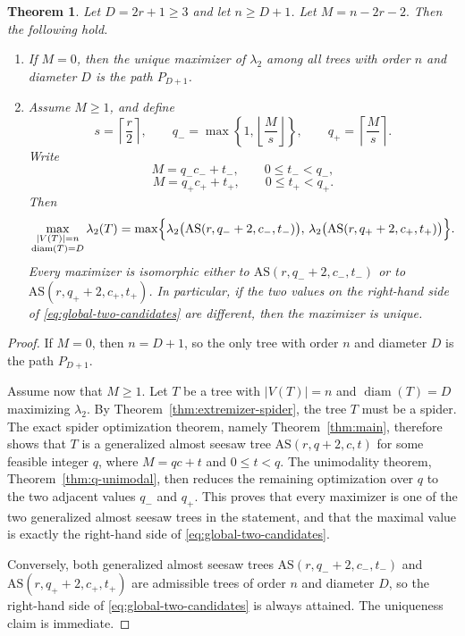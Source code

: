 \documentclass[11pt]{article}
\newtheorem{theorem}{Theorem}[section]
\theoremstyle{remark}
\newcommand{\diam}{\operatorname{diam}}
\newcommand{\AS}{\mathrm{AS}}
\begin{document}
\begin{theorem}\label{thm:global-odd}
Let $D=2r+1\ge 3$ and let $n\ge D+1$.
Let $M=n-2r-2.$ Then the following hold.
\begin{enumerate}[label=\textnormal{(\roman*)}]
    \item If $M=0$, then the unique maximizer of $\lambda_2$ among all trees with order $n$ and
    diameter $D$ is the path $P_{D+1}$.
    \item Assume $M\ge 1$, and define
    $$
    s=\left\lceil \frac{r}{2}\right\rceil,
    \qquad
    q_-=\max\!\left\{1,\left\lfloor \frac{M}{s}\right\rfloor\right\},
    \qquad
    q_+=\left\lceil \frac{M}{s}\right\rceil.
    $$
    Write
    $$
    M=q_-c_-+t_-,\qquad 0\le t_-<q_-,
    $$
    $$
    M=q_+c_++t_+,\qquad 0\le t_+<q_+.
    $$
    Then
    \begin{equation}\label{eq:global-two-candidates}
    \max_{\substack{|V(T)|=n\\ \diam(T)=D}} \lambda_2(T)
    =
    \max\Bigl\{\lambda_2\bigl(\AS(r,q_-+2,c_-,t_-)\bigr),\,
    \lambda_2\bigl(\AS(r,q_++2,c_+,t_+)\bigr)\Bigr\}.
    \end{equation}
    Every maximizer is isomorphic either to $\AS(r,q_-+2,c_-,t_-)$ or to $\AS(r,q_++2,c_+,t_+)$.
    In particular, if the two values on the right-hand side of \eqref{eq:global-two-candidates}
    are different, then the maximizer is unique.
\end{enumerate}
\end{theorem}

\begin{proof}
If $M=0$, then $n=D+1$, so the only tree with order $n$ and diameter $D$ is the path $P_{D+1}$.

Assume now that $M\ge 1$.
Let $T$ be a tree with $|V(T)|=n$ and $\diam(T)=D$ maximizing $\lambda_2$.
By Theorem~\ref{thm:extremizer-spider}, the tree $T$ must be a spider.
The exact spider optimization theorem, namely Theorem~\ref{thm:main}, therefore shows that
$T$ is a generalized almost seesaw tree $\AS(r,q+2,c,t)$ for some feasible integer $q$, where $M=qc+t$ and $0\le t<q$.
The unimodality theorem, Theorem~\ref{thm:q-unimodal}, then reduces the remaining optimization
over $q$ to the two adjacent values $q_-$ and $q_+$.
This proves that every maximizer is one of the two generalized almost seesaw trees in the statement, and that the
maximal value is exactly the right-hand side of \eqref{eq:global-two-candidates}.

Conversely, both generalized almost seesaw trees $\AS(r,q_-+2,c_-,t_-)$ and $\AS(r,q_++2,c_+,t_+)$ are admissible trees of order $n$
and diameter $D$, so the right-hand side of \eqref{eq:global-two-candidates} is always attained.
The uniqueness claim is immediate.
\end{proof}
\end{document}
